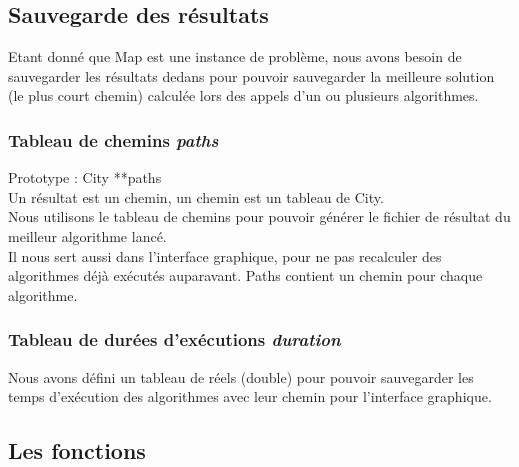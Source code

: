 \documentclass[12pt]{report}
\begin{document}
\subsection{Sauvegarde des résultats}

Etant donné que Map est une instance de problème, nous avons besoin de sauvegarder les résultats dedans pour pouvoir sauvegarder la meilleure solution (le plus court chemin) calculée lors des appels d'un ou plusieurs algorithmes.


\subsubsection{Tableau de chemins \textit{paths}}
Prototype : City **paths\\
Un résultat est un chemin, un chemin est un tableau de City.\\
Nous utilisons le tableau de chemins pour pouvoir générer le fichier de résultat du meilleur algorithme lancé.\\
Il nous sert aussi dans l'interface graphique, pour ne pas recalculer des algorithmes déjà exécutés auparavant.
Paths contient un chemin pour chaque algorithme.

\subsubsection{Tableau de durées d'exécutions \textit{duration}}
Nous avons défini un tableau de réels (double) pour pouvoir sauvegarder les temps d'exécution des algorithmes avec leur chemin pour l'interface graphique. %

\subsection{Les fonctions}
\end{document}
